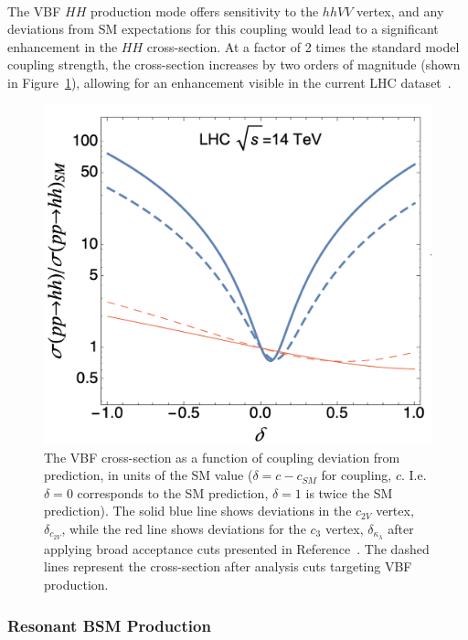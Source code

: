 \\
\indent The \gls{VBF} $HH$ production mode offers sensitivity to the $hhVV$ vertex, and any deviations from \gls{SM} expectations for this coupling would lead to a significant enhancement in the $HH$ cross-section. At a factor of 2 times the standard model coupling strength, the cross-section increases by two orders of magnitude (shown in Figure~\ref{fig:c2v-xsec}), allowing for an enhancement visible in the current \gls{LHC} dataset~\cite{vbfhh}.


\begin{figure}[!htp]
    \centering
    \includegraphics[width=.75\textwidth]{chapters/chapter1_theory/images/coupling_xsec.png}
    \caption[The VBF \HH cross-section as a function of coupling deviation from the \gls{SM} prediction]{The VBF \HH cross-section as a function of coupling deviation from prediction, in units of the \gls{SM} value ($\delta=c-c_{SM}$ for coupling, $c$. I.e. $\delta=0$ corresponds to the \gls{SM} prediction, $\delta=1$ is twice the \gls{SM} prediction). The solid blue line shows deviations in the $c_{2V}$ vertex, $\delta_{c_{2V}}$, while the red line shows deviations for the $c_{3}$ vertex, $\delta_{\kappa_{\lambda}}$ after applying broad acceptance cuts presented in Reference~\cite{vbfhh}. The dashed lines represent the cross-section after analysis cuts targeting VBF \hh production.}
    \label{fig:c2v-xsec}
\end{figure}



\subsubsection{Resonant BSM Production}\label{sssec:res-bsm-theory}

